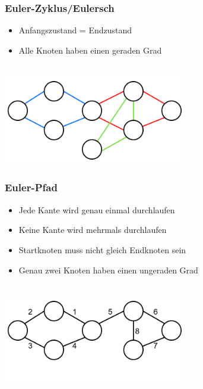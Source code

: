 \begin{minipage}{0.5\textwidth}
\subsubsection*{Euler-Zyklus/Eulersch}
\begin{itemize}[leftmargin=*]
\item Anfangszustand = Endzustand
\item Alle Knoten haben einen geraden Grad
\end{itemize}\
\\
\includegraphics[width=0.6\textwidth]{graphics/graph_euler_zyklus.png}
\end{minipage}
\hfill
\begin{minipage}{0.5\textwidth}
\subsubsection*{Euler-Pfad}
\begin{itemize}[leftmargin=*]
\item Jede Kante wird genau einmal durchlaufen
\item Keine Kante wird mehrmals durchlaufen
\item Startknoten muss nicht gleich Endknoten sein
\item Genau zwei Knoten haben einen ungeraden Grad
\end{itemize}\
\\
\includegraphics[width=0.6\textwidth]{graphics/graph_euler_pfad.png}\end{minipage}

\newpage

